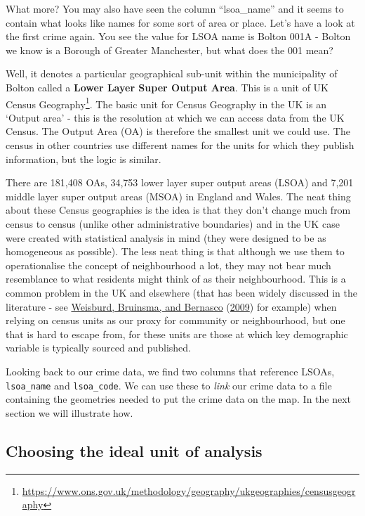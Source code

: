 \documentclass[
]{book}
\renewcommand{\href}[2]{#2\footnote{\url{#1}}}
\begin{document}
What more? You may also have seen the column ``lsoa\_name'' and it seems to contain what looks like names for some sort of area or place. Let's have a look at the first crime again. You see the value for LSOA name is Bolton 001A - Bolton we know is a Borough of Greater Manchester, but what does the 001 mean?

Well, it denotes a particular geographical sub-unit within the municipality of Bolton called a \textbf{Lower Layer Super Output Area}. This is a unit of \href{https://www.ons.gov.uk/methodology/geography/ukgeographies/censusgeography}{UK Census Geography}. The basic unit for Census Geography in the UK is an `Output area' - this is the resolution at which we can access data from the UK Census. The Output Area (OA) is therefore the smallest unit we could use. The census in other countries use different names for the units for which they publish information, but the logic is similar.

There are 181,408 OAs, 34,753 lower layer super output areas (LSOA) and 7,201 middle layer super output areas (MSOA) in England and Wales. The neat thing about these Census geographies is the idea is that they don't change much from census to census (unlike other administrative boundaries) and in the UK case were created with statistical analysis in mind (they were designed to be as homogeneous as possible). The less neat thing is that although we use them to operationalise the concept of neighbourhood a lot, they may not bear much resemblance to what residents might think of as their neighbourhood. This is a common problem in the UK and elsewhere (that has been widely discussed in the literature - see \protect\hyperlink{ref-Weisburd_2009}{Weisburd, Bruinsma, and Bernasco} (\protect\hyperlink{ref-Weisburd_2009}{2009}) for example) when relying on census units as our proxy for community or neighbourhood, but one that is hard to escape from, for these units are those at which key demographic variable is typically sourced and published.

Looking back to our crime data, we find two columns that reference LSOAs, \texttt{lsoa\_name} and \texttt{lsoa\_code}. We can use these to \emph{link} our crime data to a file containing the geometries needed to put the crime data on the map. In the next section we will illustrate how.

\hypertarget{choosing-the-ideal-unit-of-analysis}{%
\subsection{Choosing the ideal unit of analysis}\label{choosing-the-ideal-unit-of-analysis}}
\end{document}
